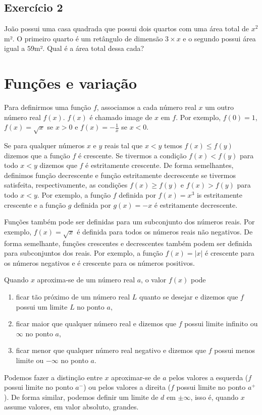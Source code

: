 \subsection*{Exercício 2}

João possui uma casa quadrada que possui dois quartos com uma área total de $x^2$m².
O primeiro quarto é um retângulo de dimensão $3 \times x$
e o segundo possui área igual a $59$m².
Qual é a área total dessa cada?

\section{Funções e variação}

Para definirmos uma função $f$,
associamos a cada número real $x$ um outro número real $f(x)$.
$f(x)$ é chamado image de $x$ em $f$.
Por exemplo,
$f(0) = 1$,
$f(x) = \sqrt{x}$ se $x > 0$
e $f(x) = -\frac{1}{x}$ se $x < 0$.

Se para qualquer números $x$ e $y$ reais tal que $x < y$
temos $f(x) \leq f(y)$ dizemos que a função $f$ é crescente.
Se tivermos a condição $f(x) < f(y)$ para todo $x < y$
dizemos que $f$ é estritamente crescente.
De forma semelhantes,
definimos função decrescente e função estritamente decrescente
se tivermos satisfeita, respectivamente, as condições
$f(x) \geq f(y)$ 
e $f(x) > f(y)$
para todo $x < y$.
Por exemplo,
a função $f$ definida por $f(x) = x^3$ is estritamente crescente e
a função $g$ definida por $g(x) = -x$ é estritamente decrescente.

Funções também pode ser definidas para um subconjunto dos números reais.
Por exemplo,
$f(x) = \sqrt{x}$ é definida para todos os números reais não negativos.
De forma semelhante,
funções crescentes e decrescentes também podem ser definida para subconjuntos dos reais.
Por exemplo,
a função $f(x) = \left| x \right|$
é crescente para os números negativos
e é crescente para os números positivos.

Quando $x$ aproxima-se de um número real $a$,
o valor $f(x)$ pode
\begin{enumerate}
  \item ficar tão próximo de um número real $L$ quanto se desejar e dizemos que
    $f$ possui um limite $L$ no ponto $a$,
  \item ficar maior que qualquer número real e dizemos que $f$ possui limite
    infinito ou $\infty$ no ponto $a$,
  \item ficar menor que qualquer número real negativo e dizemos que $f$ possui
    menos limite  ou $-\infty$ no ponto $a$.
\end{enumerate}
Podemos fazer a distinção entre $x$ aproximar-se de $a$
pelos valores a esquerda ($f$ possui limite no ponto $a^-$)
ou pelos valores a direita ($f$ possui limite no ponto $a^+$).
De forma similar, podemos definir um limite de $d$ em $\pm\infty$,
isso é, quando $x$ assume valores, em valor absoluto, grandes.

